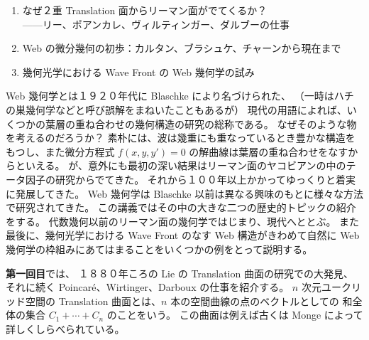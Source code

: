 \documentclass[uplatex,dvipdfmx]{jlreq}
\begin{document}
\thispagestyle{empty}

\noindent
{\large
\begin{enumerate}
  \setlength{\itemsep}{2pt}
  \item なぜ２重 Translation 面からリーマン面がでてくるか？\\
        \hspace*{\fill}——リー、ポアンカレ、ヴィルティンガー、ダルブーの仕事
  \item Web の微分幾何の初歩：カルタン、ブラシュケ、チャーンから現在まで
  \item 幾何光学における Wave Front の Web 幾何学の試み
\end{enumerate}
}

\bigskip
\hspace*{\fill}{\large\bfseries 中居 功（北海道大学・数学教室）}

\bigskip

Web 幾何学とは１９２０年代に Blaschke により名づけられた、
（一時はハチの巣幾何学などと呼び誤解をまねいたこともあるが）
現代の用語によれば、いくつかの葉層の重ね合わせの幾何構造の研究の総称である。
なぜそのような物を考えるのだろうか？
素朴には、波は幾重にも重なっているとき豊かな構造をもつし、また微分方程式
$f(x,y,y')=0$ の解曲線は葉層の重ね合わせをなすからといえる。
が、意外にも最初の深い結果はリーマン面のヤコビアンの中のテータ因子の研究からでてきた。
それから１００年以上かかってゆっくりと着実に発展してきた。
Web 幾何学は Blaschke 以前は異なる興味のもとに様々な方法で研究されてきた。
この講義ではその中の大きな二つの歴史的トピックの紹介をする。
代数幾何以前のリーマン面の幾何学ではじまり、現代へととぶ。
また最後に、幾何光学における Wave Front のなす Web 構造がきわめて自然に
Web 幾何学の枠組みにあてはまることをいくつかの例をとって説明する。

\bigskip

\noindent\textbf{第一回目}では、
１８８０年ころの Lie の Translation 曲面の研究での大発見、
それに続く Poincaré、Wirtinger、Darboux の仕事を紹介する。
$n$ 次元ユークリッド空間の Translation 曲面とは、$n$ 本の空間曲線の点のベクトルとしての
和全体の集合 $C_1 + \cdots + C_n$ のことをいう。
この曲面は例えば古くは Monge によって詳しくしらべられている。
\end{document}
